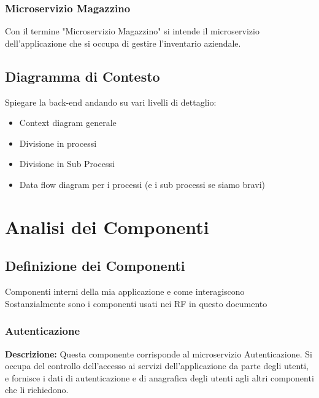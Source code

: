 \documentclass{report}
\begin{document}
\subsection*{Microservizio Magazzino}
Con il termine "Microservizio Magazzino" si intende il microservizio dell'applicazione che si occupa di gestire l'inventario aziendale.





\section{Diagramma di Contesto}

Spiegare la back-end andando su vari livelli di dettaglio:
\begin{itemize}
	\item Context diagram generale
	\item Divisione in processi
	\item Divisione in Sub Processi
	\item Data flow diagram per i processi (e i sub processi se siamo bravi)
\end{itemize}
\chapter{Analisi dei Componenti}

\section{Definizione dei Componenti}

Componenti interni della mia applicazione e come interagiscono\\
Sostanzialmente sono i componenti usati nei RF in questo documento

\subsection*{Autenticazione}
\textbf{Descrizione: } Questa componente corrisponde al microservizio Autenticazione. Si occupa del controllo dell'accesso ai servizi dell'applicazione da parte degli utenti,
e fornisce i dati di autenticazione e di anagrafica degli utenti agli altri componenti che li richiedono.
\end{document}
